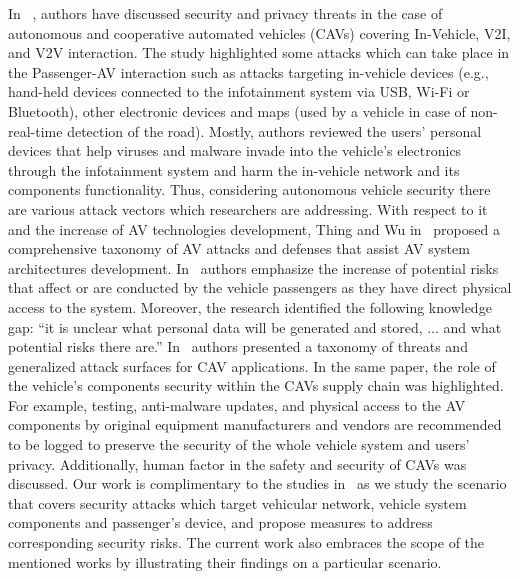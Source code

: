 \documentclass[manuscript]{acmart}
\begin{document}
In ~\cite{PotentialCyberAttacksOnAV}, authors have discussed security and privacy threats in the case of autonomous and cooperative automated vehicles (CAVs) covering In-Vehicle, V2I, and V2V interaction. The study highlighted some attacks which can take place in the Passenger-AV interaction such as attacks targeting in-vehicle devices (e.g., hand-held devices connected to the infotainment system via USB, Wi-Fi or Bluetooth), other electronic devices and maps (used by a vehicle in case of non-real-time detection of the road). Mostly, authors reviewed the users' personal devices that help viruses and malware invade into the vehicle's electronics through the infotainment system and harm the in-vehicle network and its components functionality. Thus, considering autonomous vehicle security there are various attack vectors which researchers are addressing. With respect to it and the increase of AV technologies development, Thing and Wu in~\cite{AVsecurity_AttacksDefTaxonomy_Thing_Wu} proposed a comprehensive taxonomy of AV attacks and defenses that assist AV system architectures development. In~\cite{Parkinson_cyberThreats_CAVs} authors emphasize the increase of potential risks that affect or are conducted by the vehicle passengers as they have direct physical access to the system. Moreover, the research identified the following knowledge gap: ``it is unclear what personal data will be generated and stored, ... and what potential risks there are.''
In~\cite{KHAN2020} authors presented a taxonomy of threats and generalized attack surfaces for CAV applications. In the same paper, the role of the vehicle's components security within the CAVs supply chain was highlighted. For example, testing, anti-malware updates, and physical access to the AV components by original equipment manufacturers and vendors are recommended to be logged to preserve the security of the whole vehicle system and users' privacy. Additionally, human factor in the safety and security of CAVs was discussed. Our work is complimentary to the studies in~\cite{Parkinson_cyberThreats_CAVs, AVsecurity_AttacksDefTaxonomy_Thing_Wu, KHAN2020} as we study the scenario that covers security attacks which target vehicular network, vehicle system components and passenger's device, and propose measures to address corresponding security risks. The current work also embraces the scope of the mentioned works by illustrating their findings on a particular scenario.
\end{document}
